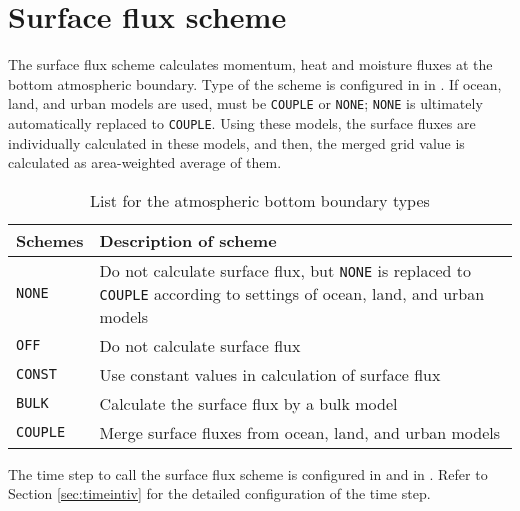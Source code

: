 \section{Surface flux scheme} \label{sec:basic_usel_surface}
The surface flux scheme calculates momentum, heat and moisture fluxes at the bottom atmospheric boundary.
Type of the scheme is configured in  in .
If ocean, land, and urban models are used,  must be \verb|COUPLE| or \verb|NONE|;
\verb|NONE| is ultimately automatically replaced to \verb|COUPLE|.
Using these models, the surface fluxes are individually calculated in these models, and then, the merged grid value is calculated as area-weighted average of them.

\begin{table}[htb]
\begin{center}
  \caption{List for the atmospheric bottom boundary types}
  \label{tab:nml_atm_sf}
  \begin{tabularx}{150mm}{lX} \hline
    \rowcolor[gray]{0.9}  Schemes & Description of scheme\\ \hline
      \verb|NONE   | & Do not calculate surface flux, but \verb|NONE| is replaced to \verb|COUPLE| according to settings of ocean, land, and urban models \\
      \verb|OFF    | & Do not calculate surface flux \\
      \verb|CONST  | & Use constant values in calculation of surface flux \\
      \verb|BULK   | & Calculate the surface flux by a bulk model \\
      \verb|COUPLE | & Merge surface fluxes from ocean, land, and urban models \\
    \hline
  \end{tabularx}
\end{center}
\end{table}


The time step to call the surface flux scheme is configured in  and  in .
Refer to Section \ref{sec:timeintiv} for the detailed configuration of the time step.



